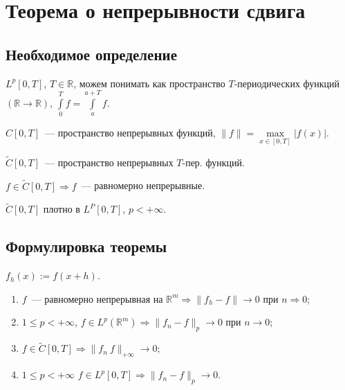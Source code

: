 \documentclass{article}
\begin{document}
    
    \newpage
    
    \section{Теорема о непрерывности сдвига}
    
        \subsection{Необходимое определение}
        
            $L^p [0, T]$, $T \in \mathbb{R}$, можем понимать как пространство $T$-периодических функций $\left( \mathbb{R} \rightarrow \mathbb{R} \right)$, $\int\limits^T_0 f = \int\limits^{a + T}_a f$.
    
            $C [0, T]$~--- пространство непрерывных функций, $\| f \| = \max\limits_{x \in [0, T]} | f(x) |$.
    
            $\widetilde{C} [0, T]$~--- пространство непрерывных $T$-пер. функций.
        
            $f \in \widetilde{C} [0, T] \Rightarrow f$~--- равномерно непрерывные.
    
            $\widetilde{C} [0, T]$ плотно в $L^P [0, T]$, $p < +\infty$.
    
        \subsection{Формулировка теоремы}
        
            $f_h(x) := f(x + h)$.
        
            \begin{enumerate}
        
                \item $f$~--- равномерно непрерывная на $\mathbb{R}^m \Rightarrow \| f_h - f \| \rightarrow 0$ при $n \Rightarrow 0$;
            
                \item $1 \leqslant p < +\infty$, $f \in L^p \left( \mathbb{R}^m \right) \Rightarrow \| f_n - f \|_p \rightarrow 0$ при $n \rightarrow 0$;
            
                \item $f \in \widetilde{C} [0, T] \Rightarrow \| f_n \ f \|_{+\infty} \rightarrow 0$;
            
                \item $1 \leqslant p < +\infty$ $f \in L^p [0, T] \Rightarrow \| f_n - f \|_p \rightarrow 0$.
            
            \end{enumerate}
        
\end{document}

